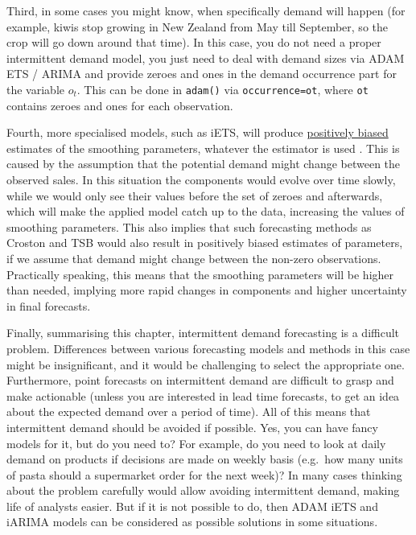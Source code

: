 \documentclass[
]{book}
\theoremstyle{definition}
\theoremstyle{definition}
\theoremstyle{definition}
\theoremstyle{definition}
\theoremstyle{remark}
\begin{document}
Third, in some cases you might know, when specifically demand will happen (for example, kiwis stop growing in New Zealand from May till September, so the crop will go down around that time). In this case, you do not need a proper intermittent demand model, you just need to deal with demand sizes via ADAM ETS / ARIMA and provide zeroes and ones in the demand occurrence part for the variable \(o_t\). This can be done in \texttt{adam()} via \texttt{occurrence=ot}, where \texttt{ot} contains zeroes and ones for each observation.

Fourth, more specialised models, such as iETS, will produce \protect\hyperlink{estimatesPropertiesBias}{positively biased} estimates of the smoothing parameters, whatever the estimator is used \citep[see explanation in][]{Svetunkov2019a}. This is caused by the assumption that the potential demand might change between the observed sales. In this situation the components would evolve over time slowly, while we would only see their values before the set of zeroes and afterwards, which will make the applied model catch up to the data, increasing the values of smoothing parameters. This also implies that such forecasting methods as Croston \citep{Croston1972} and TSB \citep{Teunter2011} would also result in positively biased estimates of parameters, if we assume that demand might change between the non-zero observations. Practically speaking, this means that the smoothing parameters will be higher than needed, implying more rapid changes in components and higher uncertainty in final forecasts.

Finally, summarising this chapter, intermittent demand forecasting is a difficult problem. Differences between various forecasting models and methods in this case might be insignificant, and it would be challenging to select the appropriate one. Furthermore, point forecasts on intermittent demand are difficult to grasp and make actionable (unless you are interested in lead time forecasts, to get an idea about the expected demand over a period of time). All of this means that intermittent demand should be avoided if possible. Yes, you can have fancy models for it, but do you need to? For example, do you need to look at daily demand on products if decisions are made on weekly basis (e.g.~how many units of pasta should a supermarket order for the next week)? In many cases thinking about the problem carefully would allow avoiding intermittent demand, making life of analysts easier. But if it is not possible to do, then ADAM iETS and iARIMA models can be considered as possible solutions in some situations.
\end{document}
